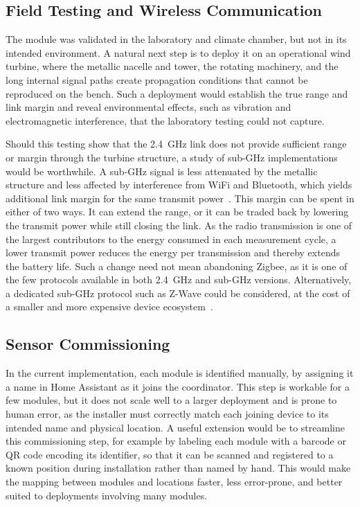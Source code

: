 \subsection{Field Testing and Wireless Communication}
The module was validated in the laboratory and climate chamber, but not in its intended environment. A natural next step is to deploy it on an operational wind turbine, where the metallic nacelle and tower, the rotating machinery, and the long internal signal paths create propagation conditions that cannot be reproduced on the bench. Such a deployment would establish the true range and link margin and reveal environmental effects, such as vibration and electromagnetic interference, that the laboratory testing could not capture.
 
Should this testing show that the \SI{2.4}{\giga\hertz} link does not provide sufficient range or margin through the turbine structure, a study of sub-\si{\giga\hertz} implementations would be worthwhile. A sub-\si{\giga\hertz} signal is less attenuated by the metallic structure and less affected by interference from WiFi and Bluetooth, which yields additional link margin for the same transmit power~\cite{silabs_subghz_priorities}. This margin can be spent in either of two ways. It can extend the range, or it can be traded back by lowering the transmit power while still closing the link. As the radio transmission is one of the largest contributors to the energy consumed in each measurement cycle, a lower transmit power reduces the energy per transmission and thereby extends the battery life. Such a change need not mean abandoning Zigbee, as it is one of the few protocols available in both \SI{2.4}{\giga\hertz} and sub-\si{\giga\hertz} versions. Alternatively, a dedicated sub-\si{\giga\hertz} protocol such as Z-Wave could be considered, at the cost of a smaller and more expensive device ecosystem~\cite{homey_zigbee_vs_zwave}. 

\subsection{Sensor Commissioning}
In the current implementation, each module is identified manually, by assigning it a name in Home Assistant as it joins the coordinator. This step is workable for a few modules, but it does not scale well to a larger deployment and is prone to human error, as the installer must correctly match each joining device to its intended name and physical location. A useful extension would be to streamline this commissioning step, for example by labeling each module with a barcode or QR code encoding its identifier, so that it can be scanned and registered to a known position during installation rather than named by hand. This would make the mapping between modules and locations faster, less error-prone, and better suited to deployments involving many modules.


